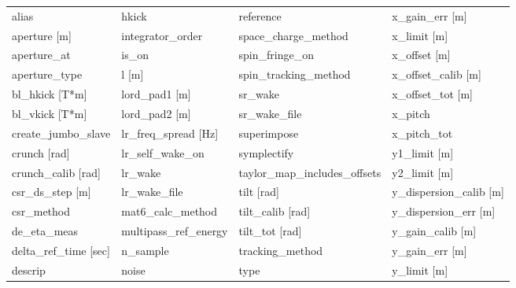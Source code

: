  \begin{tabular}{llll} \toprule
alias                            & hkick                            & reference                        & x_gain_err [m]                   \\
aperture [m]                     & integrator_order                 & space_charge_method              & x_limit [m]                      \\
aperture_at                      & is_on                            & spin_fringe_on                   & x_offset [m]                     \\
aperture_type                    & l [m]                            & spin_tracking_method             & x_offset_calib [m]               \\
bl_hkick [T*m]                   & lord_pad1 [m]                    & sr_wake                          & x_offset_tot [m]                 \\
bl_vkick [T*m]                   & lord_pad2 [m]                    & sr_wake_file                     & x_pitch                          \\
create_jumbo_slave               & lr_freq_spread [Hz]              & superimpose                      & x_pitch_tot                      \\
crunch [rad]                     & lr_self_wake_on                  & symplectify                      & y1_limit [m]                     \\
crunch_calib [rad]               & lr_wake                          & taylor_map_includes_offsets      & y2_limit [m]                     \\
csr_ds_step [m]                  & lr_wake_file                     & tilt [rad]                       & y_dispersion_calib [m]           \\
csr_method                       & mat6_calc_method                 & tilt_calib [rad]                 & y_dispersion_err [m]             \\
de_eta_meas                      & multipass_ref_energy             & tilt_tot [rad]                   & y_gain_calib [m]                 \\
delta_ref_time [sec]             & n_sample                         & tracking_method                  & y_gain_err [m]                   \\
descrip                          & noise                            & type                             & y_limit [m]                      \\

\end{tabular}

